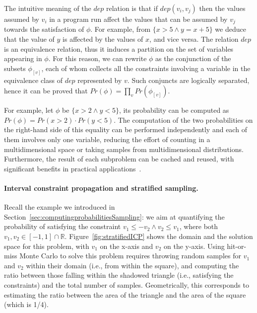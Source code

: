 The intuitive meaning of the $\textit{dep}$ relation is that if $\textit{dep}(v_i,v_j)$ then the values assumed by $v_i$ in a program run affect the values that can be assumed by $v_j$ towards the satisfaction of $\phi$. For example, from $\{x>5 \land y=x+5\}$ we deduce that the value of $y$ is affected by the values of $x$, and vice versa. The relation $\textit{dep}$ is an equivalence relation, thus it induces a partition on the set of variables appearing in $\phi$. For this reason, we can rewrite $\phi$ as the conjunction of the subsets $\phi_{[v]}$, each of whom collects all the constraints involving a variable in the equivalence class of $\textit{dep}$ represented by $v$. Such conjuncts are logically separated, hence it can be proved that $\textit{Pr}(\phi)= \prod_{v} \textit{Pr}(\phi_{[v]})$. 

For example, let $\phi$ be $\{x>2 \land y<5\}$, its probability can be computed as $\textit{Pr}(\phi)=\textit{Pr}(x>2) \cdot \textit{Pr}(y<5)$. The computation of the two probabilities on the right-hand side of this equality can be performed independently and each of them involves only one variable, reducing the effort of counting in a multidimensional space or taking samples from multidimensional distributions. Furthermore, the result of each subproblem can be cached and reused, with significant benefits in practical applications~\cite{Filieri2013}.



\paragraph{Interval constraint propagation and stratified sampling.}

Recall the example we introduced in Section~\ref{sec:computingprobabilitiesSampling}: we aim at quantifying the probability of satisfying the constraint 
$v_1 \leq -v_2 \land v_2 \leq v_1$, where both $v_1, v_2 \in [-1, 1] \cap \mathbb{R}$. Figure~\ref{fig:stratifiedICP} shows the domain and the solution space for this problem, with $v_1$ on the x-axis and $v_2$ on the y-axis. Using hit-or-miss Monte Carlo to solve this problem requires throwing random samples for $v_1$ and $v_2$ within their domain (i.e., from within the square), and computing the ratio between those falling within the shadowed triangle (i.e., satisfying the constraints) and the total number of samples. Geometrically, this corresponds to estimating the ratio between the area of the triangle and the area of the square (which is 1/4).

